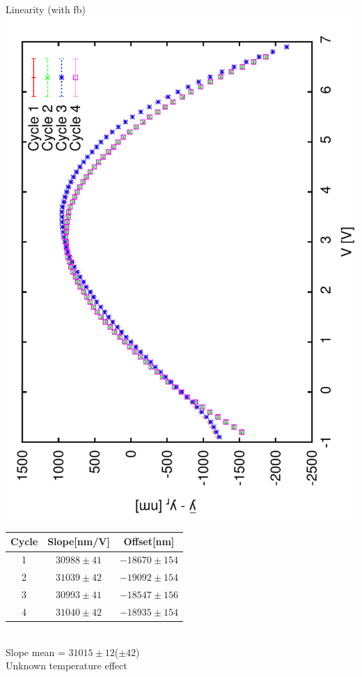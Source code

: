\documentclass[a4paper,11pt]{book}
\begin{document}
Linearity (with fb)
\includegraphics[angle=-90,scale=0.22]{image26e.pdf}
\begin{tabular}[]{|c|c|c|}\hline
 Cycle & Slope[nm/V] & Offset[nm] \\\hline
 {\color{red}1} & $30988 \pm 41$& $-18670\pm154$\\
{\color{green}2} & $31039 \pm 42$& $-19092\pm154$ \\
{\color{blue}3} & $30993\pm 41$& $-18547\pm156$\\
{\color{magenta}4} & $31040 \pm42$ & $-18935\pm154$\\\hline
\end{tabular}\\Slope mean = $31015\pm12$($\pm42$)\\Unknown temperature effect\\
\end{document}
